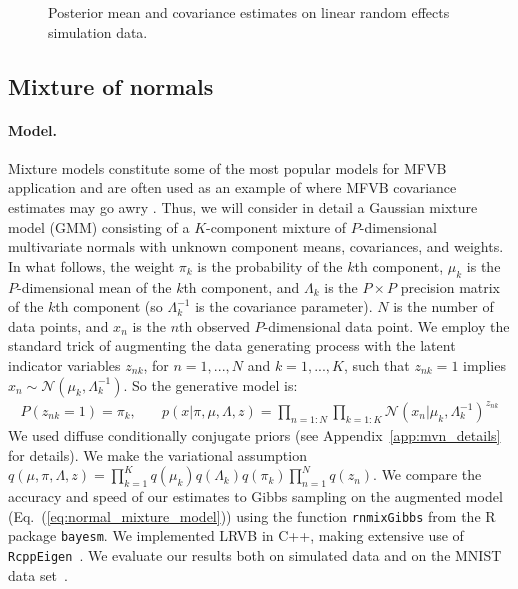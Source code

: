 \documentclass{article}\usepackage[]{graphicx}\usepackage[]{color}
\newenvironment{knitrout}{}{} %
\newcommand{\app}[1]{Appendix~\ref{app:#1}}
\newcommand{\eq}[1]{Eq.~(\ref{eq:#1})}
\newcommand{\gauss}{\mathcal{N}} %
\theoremstyle{plain}
\begin{document}
\begin{knitrout}
\begin{figure}[ht!]
{}

\caption[Posterior mean and covariance estimates on linear random effects simulation data]{Posterior mean and covariance estimates on linear random effects simulation data.}\label{fig:RE_SimulationResults}
\end{figure}


\end{knitrout}
\subsection{Mixture of normals} \label{sec:normal_mixture_model}
\paragraph{Model.}
%
Mixture models constitute some of the most popular models for MFVB application
\citep{blei:2003:lda, blei:2006:dp} and are often used as an example of where
MFVB covariance estimates may go awry \citep{bishop:2006:pattern,
turner:2011:two}. Thus, we will consider in detail a Gaussian mixture model
(GMM) consisting of a $K$-component mixture of $P$-dimensional multivariate
normals with unknown component means, covariances, and weights. In what follows,
the weight $\pi_k$ is the probability of the $k$th component, $\mu_k$ is the
$P$-dimensional mean of the $k$th component, and $\Lambda_k$ is the $P \times P$
precision matrix of the $k$th component (so $\Lambda_k^{-1}$ is the covariance
parameter).  $N$ is the number of data points, and $x_{n}$ is the $n$th observed
$P$-dimensional data point. We employ the standard trick of augmenting the data
generating process with the latent indicator variables $z_{nk}$, for $n=1,...,N$
and $k=1,...,K$, such that $z_{nk} = 1$ implies $x_{n} \sim \gauss(\mu_k,
\Lambda^{-1}_k)$. So the generative model is:
%
\begin{align}
P(z_{nk} = 1) = \pi_k, & \quad
p(x | \pi, \mu, \Lambda, z) =
    \prod_{n=1:N} \prod_{k=1:K} \gauss(x_n | \mu_k, \Lambda^{-1}_k)^{z_{nk}}
    \label{eq:normal_mixture_model}
\end{align}
%
We used diffuse conditionally conjugate priors (see \app{mvn_details} for
details). We make the variational assumption $q\left(\mu, \pi, \Lambda, z\right) =
\prod_{k=1}^K
q\left(\mu_k\right)q\left(\Lambda_k\right)q\left(\pi_k\right)\prod_{n=1}^N
q\left(z_{n}\right)$. We compare the accuracy and speed of our estimates to
Gibbs sampling on the augmented model (\eq{normal_mixture_model}) using the
function \texttt{rnmixGibbs} from the R package \texttt{bayesm}.  We implemented
LRVB in C++, making extensive use of
\texttt{RcppEigen}~\citep{rpackage:RcppEigen}. We evaluate our results both on
simulated data and on the MNIST data set~\citep{mnist:lecun1998gradient}.
%
\end{document}
